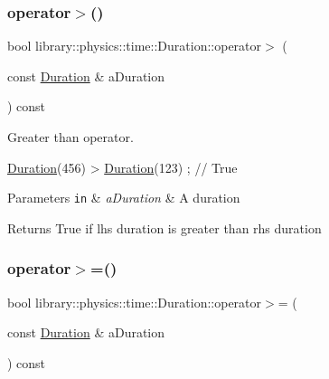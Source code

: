 \subsubsection{\texorpdfstring{operator$>$()}{operator>()}}
{\footnotesize\ttfamily bool library\+::physics\+::time\+::\+Duration\+::operator$>$ (\begin{DoxyParamCaption}\item[{const \hyperlink{classlibrary_1_1physics_1_1time_1_1_duration}{Duration} \&}]{a\+Duration }\end{DoxyParamCaption}) const}



Greater than operator. 


\begin{DoxyCode}
\hyperlink{classlibrary_1_1physics_1_1time_1_1_duration_a0a70efcf487a841da572afcf00001f64}{Duration}(456) > \hyperlink{classlibrary_1_1physics_1_1time_1_1_duration_a0a70efcf487a841da572afcf00001f64}{Duration}(123) ; \textcolor{comment}{// True}
\end{DoxyCode}



\begin{DoxyParams}[1]{Parameters}
\mbox{\tt in}  & {\em a\+Duration} & A duration \\
\hline
\end{DoxyParams}
\begin{DoxyReturn}{Returns}
True if lhs duration is greater than rhs duration 
\end{DoxyReturn}
\mbox{\label{classlibrary_1_1physics_1_1time_1_1_duration_a4338d704712640124d44a6e7a52909ea}} 
\subsubsection{\texorpdfstring{operator$>$=()}{operator>=()}}
{\footnotesize\ttfamily bool library\+::physics\+::time\+::\+Duration\+::operator$>$= (\begin{DoxyParamCaption}\item[{const \hyperlink{classlibrary_1_1physics_1_1time_1_1_duration}{Duration} \&}]{a\+Duration }\end{DoxyParamCaption}) const}



